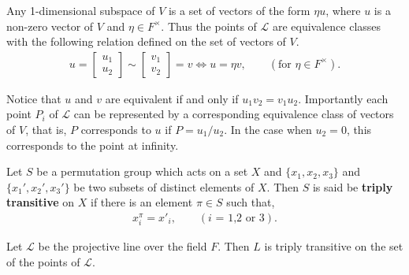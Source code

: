 Any 1-dimensional subspace of $V$ is a set of vectors of the form $\eta u$, where $u$ is a non-zero vector of $V$ and $\eta \in F^\times$. Thus the points of $\mathscr{L}$ are equivalence classes with the following relation defined on the set of vectors of $V$.
\begin{align*} u = \begin{bmatrix} u_1 \\ u_2 \end{bmatrix} \sim \begin{bmatrix} v_1 \\ v_2 \end{bmatrix} = v \iff u = \eta v, \qquad (\text{for $\eta \in F^\times$}).
\end{align*}

Notice that $u$ and $v$ are equivalent if and only if $u_1 v_2 = v_1 u_2$. Importantly each point $P_i$ of $\mathscr{L}$ can be represented by a corresponding equivalence class of vectors of $V$, that is, $P$ corresponds to $u$ if $P = u_1 / u_2$. In the case when $u_2 = 0$, this corresponds to the point at infinity.

\begin{definition} Let $S$ be a permutation group which acts on a set $X$ and $\{ x_1, x_2, x_3 \}$ and $\{ x_1', x_2', x_3' \}$ be two subsets of distinct elements of $X$. Then $S$ is said be \textbf{triply transitive} on $X$ if there is an element $\pi \in S$ such that,
\begin{align*} x^{\pi}_i = x'_i, \qquad(\text{$i$ = 1,2 or 3}).
\end{align*} 
\end{definition}

\begin{theorem} \label{6.6}
Let $\mathscr{L}$ be the projective line over the field $F$. Then $L$ is triply transitive on the set of the points of $\mathscr{L}$. \vspace{3mm}
\end{theorem}

